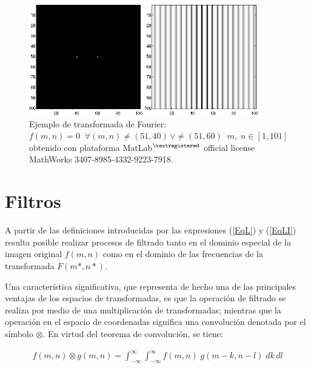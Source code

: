 \begin{center}
\begin{figure} [!h]

\centering
\includegraphics[width=10cm]{Figuras/Fig2_5.png}
   
\caption{Ejemplo de transformada de Fourier: $f(m, n) = 0 \; \; \forall (m, n) \neq (51, 40) \, \vee \neq (51, 60) \; \;  m, \; n \in [1, 101]$
         obtenido con plataforma MatLab$^{\textregistered}$ official license MathWorks 3407-8985-4332-9223-7918.}
\label{Fig2_5}

\end{figure}
\end{center}



\section{Filtros}


A partir de las definiciones introducidas por las expresiones (\ref{EqL}) y (\ref{EqLI}) resulta posible realizar procesos de filtrado tanto en el dominio
especial de la imagen original $f(m, n)$ como en el dominio de las frecuencias de la transformada $F(m*, n*)$.
%

%
Una caracter\'istica significativa, que representa de hecho una de las principales ventajas de los espacios de transformadas, es que la operaci\'on de 
filtrado se realiza por medio de una multiplicaci\'on de transformadas; mientras que la operaci\'on en el espacio de coordenadas significa una convoluci\'on
denotada por el s\'imbolo $\otimes$. En virtud del teorema de convoluci\'on, se tiene:

\begin{eqnarray}
	f(m, n) \otimes g(m, n) = \int_{-\infty}^{\infty} \int_{-\infty}^{\infty} f(m, n) \; g(m-k, n-l)\; dk \, dl
\label{EqLII}
\end{eqnarray}

